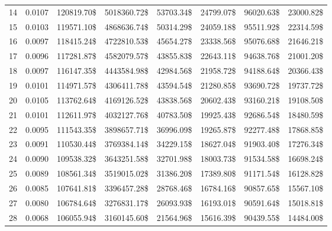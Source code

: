 \begin{tabular}{lrrrrrrr}
14 & \num{0.0107} & \num{120819.70}\$ & \num{5018360.72}\$ & \num{53703.34}\$ & \num{24799.07}\$ &  \num{96020.63}\$ & \num{23000.82}\$ \\
15 & \num{0.0103} & \num{119571.10}\$ & \num{4868636.74}\$ & \num{50314.29}\$ & \num{24059.18}\$ &  \num{95511.92}\$ & \num{22314.59}\$ \\
16 & \num{0.0097} & \num{118415.24}\$ & \num{4722810.53}\$ & \num{45654.27}\$ & \num{23338.56}\$ &  \num{95076.68}\$ & \num{21646.21}\$ \\
17 & \num{0.0096} & \num{117281.87}\$ & \num{4582079.57}\$ & \num{43855.83}\$ & \num{22643.11}\$ &  \num{94638.76}\$ & \num{21001.20}\$ \\
18 & \num{0.0097} & \num{116147.35}\$ & \num{4443584.98}\$ & \num{42984.56}\$ & \num{21958.72}\$ &  \num{94188.64}\$ & \num{20366.43}\$ \\
19 & \num{0.0101} & \num{114971.57}\$ & \num{4306411.78}\$ & \num{43594.54}\$ & \num{21280.85}\$ &  \num{93690.72}\$ & \num{19737.72}\$ \\
20 & \num{0.0105} & \num{113762.64}\$ & \num{4169126.52}\$ & \num{43838.56}\$ & \num{20602.43}\$ &  \num{93160.21}\$ & \num{19108.50}\$ \\
21 & \num{0.0101} & \num{112611.97}\$ & \num{4032127.76}\$ & \num{40783.50}\$ & \num{19925.43}\$ &  \num{92686.54}\$ & \num{18480.59}\$ \\
22 & \num{0.0095} & \num{111543.35}\$ & \num{3898657.71}\$ & \num{36996.09}\$ & \num{19265.87}\$ &  \num{92277.48}\$ & \num{17868.85}\$ \\
23 & \num{0.0091} & \num{110530.44}\$ & \num{3769384.14}\$ & \num{34229.15}\$ & \num{18627.04}\$ &  \num{91903.40}\$ & \num{17276.34}\$ \\
24 & \num{0.0090} & \num{109538.32}\$ & \num{3643251.58}\$ & \num{32701.98}\$ & \num{18003.73}\$ &  \num{91534.58}\$ & \num{16698.24}\$ \\
25 & \num{0.0089} & \num{108561.34}\$ & \num{3519015.02}\$ & \num{31386.20}\$ & \num{17389.80}\$ &  \num{91171.54}\$ & \num{16128.82}\$ \\
26 & \num{0.0085} & \num{107641.81}\$ & \num{3396457.28}\$ & \num{28768.46}\$ & \num{16784.16}\$ &  \num{90857.65}\$ & \num{15567.10}\$ \\
27 & \num{0.0080} & \num{106784.64}\$ & \num{3276831.17}\$ & \num{26093.93}\$ & \num{16193.01}\$ &  \num{90591.64}\$ & \num{15018.81}\$ \\
28 & \num{0.0068} & \num{106055.94}\$ & \num{3160145.60}\$ & \num{21564.96}\$ & \num{15616.39}\$ &  \num{90439.55}\$ & \num{14484.00}\$ \\

\end{tabular}
